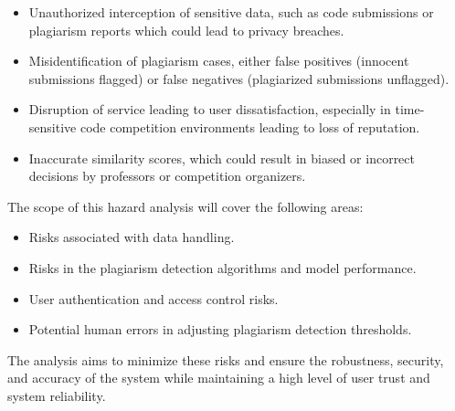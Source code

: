 \documentclass{article}
\begin{document}
\begin{itemize}
    \item Unauthorized interception of sensitive data, such as code submissions or plagiarism reports which could lead to privacy breaches.
    \item Misidentification of plagiarism cases, either false positives (innocent submissions flagged) or false negatives (plagiarized submissions unflagged).
    \item Disruption of service leading to user dissatisfaction, especially in time-sensitive code competition environments leading to loss of reputation.
    \item Inaccurate similarity scores, which could result in biased or incorrect decisions by professors or competition organizers.
\end{itemize}

The scope of this hazard analysis will cover the following areas:
\begin{itemize}
    \item Risks associated with data handling.
    \item Risks in the plagiarism detection algorithms and model performance.
    \item User authentication and access control risks.
    \item Potential human errors in adjusting plagiarism detection thresholds.
\end{itemize}

The analysis aims to minimize these risks and ensure the robustness, security, and accuracy of the system while maintaining a high level of user trust and system reliability.
\end{document}
